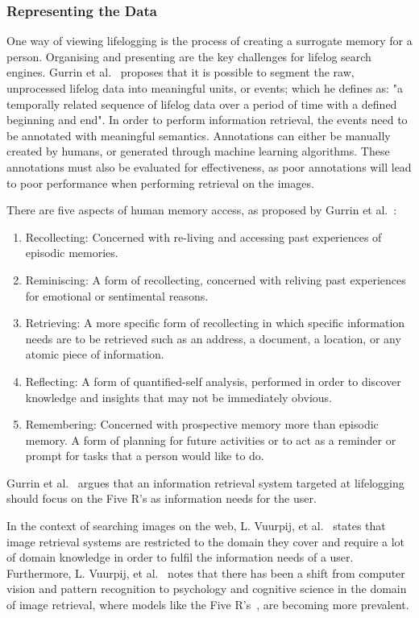 \subsubsection{Representing the Data}
One way of viewing lifelogging is the process of creating a surrogate memory for a person. Organising and presenting are the key challenges for lifelog search engines. Gurrin et al.~\cite{gurrin2014lifelogging} proposes that it is possible to segment the raw, unprocessed lifelog data into meaningful units, or events; which he defines as: "a temporally related sequence of lifelog data over a period of time with a defined beginning and end". In order to perform information retrieval, the events need to be annotated with meaningful semantics. Annotations can either be manually created by humans, or generated through machine learning algorithms. These annotations must also be evaluated for effectiveness, as poor annotations will lead to poor performance when performing retrieval on the images.

There are five aspects of human memory access, as proposed by Gurrin et al.~\cite{gurrin2014lifelogging}:
\begin{enumerate}
    \item Recollecting: Concerned with re-living and accessing past experiences of episodic memories.
    \item Reminiscing: A form of recollecting, concerned with reliving past experiences for emotional or sentimental reasons.
    \item Retrieving: A more specific form of recollecting  in which specific information needs are to be retrieved such as an address, a document, a location, or any atomic piece of information.
    \item Reflecting: A form of quantified-self analysis, performed in order to discover knowledge and insights that may not be immediately obvious.
    \item Remembering: Concerned with prospective memory more than episodic memory. A form of planning for future activities or to act as a reminder or prompt for tasks that a person would like to do.
\end{enumerate}
Gurrin et al.~\cite{gurrin2014lifelogging} argues that an information retrieval system targeted at lifelogging should focus on the Five R's as information needs for the user.

In the context of searching images on the web,  L. Vuurpij, et al.~\cite{vuurpij2002vind} states that image retrieval systems are restricted to the domain they cover and require a lot of domain knowledge in order to fulfil the information needs of a user. Furthermore, L. Vuurpij, et al.~\cite{vuurpij2002vind} notes that there has been a shift from computer vision and pattern recognition to psychology and cognitive science in the domain of image retrieval, where models like the Five R's~\cite{gurrin2014lifelogging}, are becoming more prevalent. 

